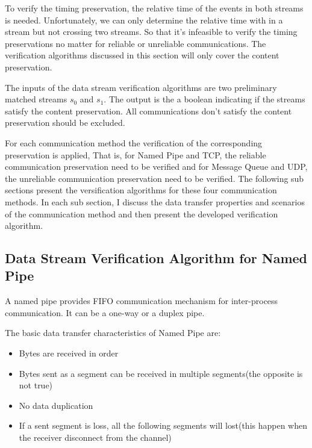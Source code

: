 To verify the timing preservation, the relative time of the events in both streams is needed. Unfortunately, we can only determine the relative time with in a stream but not crossing two streams. So that it's infeasible to verify the timing preservations no matter for reliable or unreliable communications. The verification algorithms discussed in this section will only cover the content preservation.  

The inputs of the data stream verification algorithms are two preliminary matched streams $s_0$ and $s_1$. The output is the a boolean indicating if the streams satisfy the content preservation. All communications don't satisfy the content preservation should be excluded.

For each communication method the verification of the corresponding preservation is applied, That is, for Named Pipe and TCP, the reliable communication preservation need to be verified and for Message Queue and UDP, the unreliable communication preservation need to be verified. The following sub sections present the versification  algorithms for these four communication methods. In each sub section, I discuss the data transfer properties and scenarios of the communication method and then present the developed verification algorithm.

\subsection{Data Stream Verification Algorithm for Named Pipe}
A named pipe provides FIFO communication mechanism for inter-process communication. It can be a one-way or a duplex pipe. \cite{khambattinamed}

The basic data transfer characteristics of Named Pipe are:
\begin{itemize}
  \item Bytes are received in order
  \item Bytes sent as a segment can be received in multiple segments(the opposite is not true)
  \item No data duplication
  \item If a sent segment is loss, all the following segments will lost(this happen when the receiver disconnect from the channel) 
  
\end{itemize}

